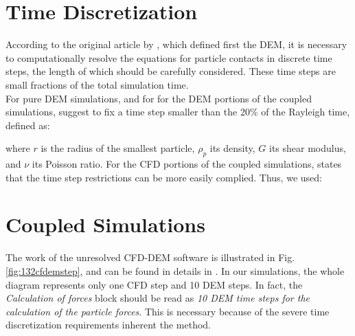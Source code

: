\section{Time Discretization}
\label{sec:timestep}

According to the original article by \citet{RefWorks:172}, which defined first
the \acs{DEM}, 
it is necessary to computationally resolve the equations for particle contacts
in discrete time steps, the length of which should be carefully considered.
These time steps are small fractions of the total simulation time.\\
For pure \acs{DEM} simulations, and for for the \acs{DEM} portions of the
coupled simulations, \citet{RefWorks:172} suggest to fix a time step smaller
than the 20\% of the Rayleigh time, defined as:

where $r$ is the radius of the smallest particle, $\rho_p$ its density, $G$ its
shear modulus, and $\nu$ its Poisson ratio.
For the \acs{CFD} portions of the coupled simulations, \citet{RefWorks:201}
states that the time step restrictions can be more easily complied.
Thus, we used:


\section{Coupled Simulations}
\label{sec:coupledsimulations}



The work of the unresolved \acs{CFD}-\acs{DEM} software is
illustrated in Fig. \ref{fig:132cfdemstep}, and can be
found in details in \citet{RefWorks:201}.
In our simulations, the whole diagram represents only one \acs{CFD} step and 10
\acs{DEM} steps. 
In fact, the \textit{Calculation of forces} block should be read as
\textit{10 \acs{DEM} time steps for the calculation of the particle forces}.
This is necessary because of the severe time discretization requirements
inherent the method.
